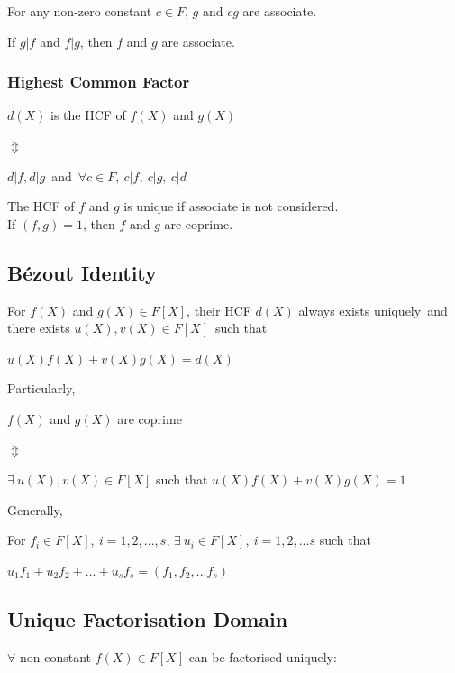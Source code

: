 \documentclass{article}
\begin{document}
\vspace{0.2cm}
\noindent
For any non-zero constant $c \in F$, $g$ and $cg$ are associate.

\vspace{0.2cm}
\noindent
If $g|f$ and $f|g$, then $f$ and $g$ are associate.

\subsubsection{Highest Common Factor}
\noindent
\begin{center}
$d(X)$ is the HCF of $f(X)$ and $g(X)$

$\Updownarrow$\

$d|f, d|g$\  and\  $\forall c \in F,\  c|f,\  c|g,\  c|d$
\end{center}

\noindent
The HCF of $f$ and $g$ is unique if associate is not considered.\\
If $(f,g) = 1$, then $f$ and $g$ are coprime.

\subsection{B\'{e}zout Identity}
For $f(X)$ and $g(X) \in F[X]$, their HCF $d(X)$ always exists uniquely\ 
and there exists $u(X), v(X) \in F[X]$\ 
such that

\begin{center}
$u(X)f(X) + v(X)g(X) =  d(X)$
\end{center}

\noindent
Particularly,

\noindent
\begin{center}
$f(X)$ and $g(X)$ are coprime

$\Updownarrow$

$\exists\  u(X), v(X) \in F[X]$ such that $u(X)f(X) + v(X)g(X) = 1$
\end{center}

\noindent
Generally,

\noindent
For $f_i \in F[X],\ i = 1,2,...,s$, $\exists\ u_i \in F[X],\ i=1,2,...s$ such that
\begin{center}
$u_1f_1+u_2f_2+...+u_sf_s = (f_1,f_2,...f_s)$
\end{center}

\subsection{Unique Factorisation Domain}
$\forall$ non-constant $f(X) \in F[X]$ can be factorised uniquely:
\end{document}
